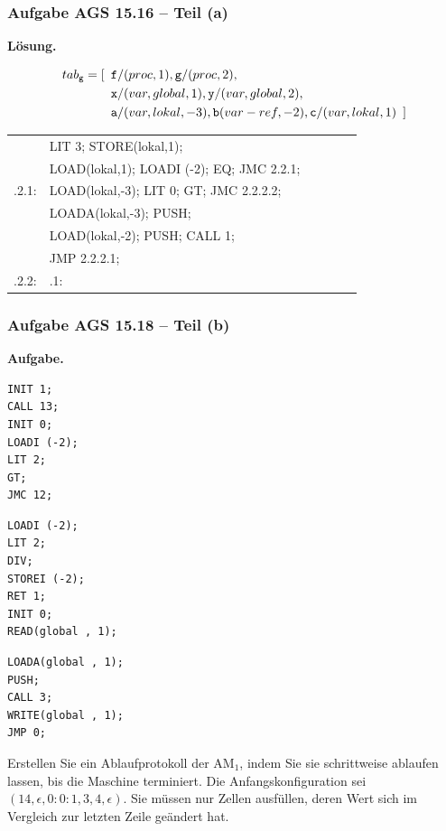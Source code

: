 \documentclass{beamer}
\begin{document}
\begin{frame} \frametitle{Aufgabe AGS 15.16 -- Teil (a)}
	\footnotesize
	\textbf{Lösung.}
	
	\begin{align*}
		tab_{\texttt{g}} = [ \enskip &\texttt{f}/(proc, 1), \texttt{g}/(proc, 2),\\
		&\texttt{x}/(var, global, 1), \texttt{y}/(var, global, 2), \\
		&\texttt{a}/(var, lokal, -3), \texttt{b}(var-ref, -2), \texttt{c}/(var, lokal, 1) \enskip]
	\end{align*}
	
	\pause
	
	\begin{tabular}{>{\ttfamily}r >{\ttfamily}l >{\ttfamily}l >{\ttfamily}l >{\ttfamily}l >{\ttfamily}l}
		& LIT 3; STORE(lokal,1); \\
		& LOAD(lokal,1); LOADI (-2); EQ; JMC 2.2.1; \\
		2.2.2.1: & LOAD(lokal,-3); LIT 0; GT; JMC 2.2.2.2; \\
		& LOADA(lokal,-3); PUSH; \\
		& LOAD(lokal,-2); PUSH; CALL 1; \\
		& JMP 2.2.2.1; \\
		2.2.2.2: & 2.2.1:
	\end{tabular}
\end{frame}

\begin{frame}[fragile] \frametitle{Aufgabe AGS 15.18 -- Teil (b)}
	\footnotesize
	\textbf{Aufgabe.}
	
	\begin{minipage}{\dimexpr0.33\linewidth-\fboxrule-\fboxsep}
		\begin{lstlisting}[style=am0]
INIT 1;
CALL 13;
INIT 0;
LOADI (-2);
LIT 2;
GT;
JMC 12;
		\end{lstlisting}
	\end{minipage}
	\begin{minipage}{\dimexpr0.33\linewidth-\fboxrule-\fboxsep}
		\begin{lstlisting}[style=am0, firstnumber=8]
LOADI (-2);
LIT 2;
DIV;
STOREI (-2);
RET 1;
INIT 0;
READ(global , 1);
		\end{lstlisting}
	\end{minipage}
	\begin{minipage}{\dimexpr0.33\linewidth-\fboxrule-\fboxsep}
		\begin{lstlisting}[style=am0, firstnumber=15]
LOADA(global , 1);
PUSH;
CALL 3;
WRITE(global , 1);
JMP 0;
		\end{lstlisting}
	\end{minipage}
	
	\bigskip
	
	Erstellen Sie ein Ablaufprotokoll der AM${}_\text{1}$, indem Sie sie schrittweise ablaufen lassen, bis die Maschine terminiert. Die Anfangskonfiguration sei $(14, \epsilon, 0 : 0 : 1, 3, 4, \epsilon)$. Sie müssen nur Zellen ausfüllen, deren Wert sich im Vergleich zur letzten Zeile geändert hat.
\end{frame}
\end{document}
